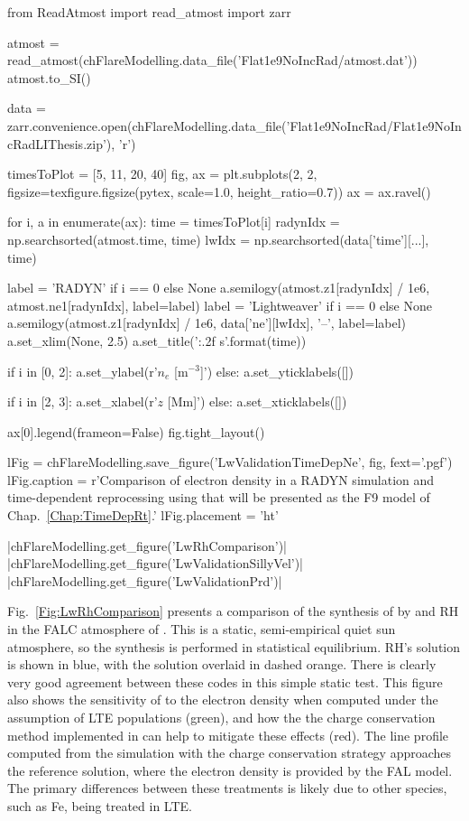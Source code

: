 \begin{pycode}[FlareModelling]
from ReadAtmost import read_atmost
import zarr

atmost = read_atmost(chFlareModelling.data_file('Flat1e9NoIncRad/atmost.dat'))
atmost.to_SI()

data = zarr.convenience.open(chFlareModelling.data_file('Flat1e9NoIncRad/Flat1e9NoIncRadLIThesis.zip'), 'r')

timesToPlot = [5, 11, 20, 40]
fig, ax = plt.subplots(2, 2, figsize=texfigure.figsize(pytex, scale=1.0, height_ratio=0.7))
ax = ax.ravel()

for i, a in enumerate(ax):
    time = timesToPlot[i]
    radynIdx = np.searchsorted(atmost.time, time)
    lwIdx = np.searchsorted(data['time'][...], time)

    label = 'RADYN' if i == 0 else None
    a.semilogy(atmost.z1[radynIdx] / 1e6, atmost.ne1[radynIdx], label=label)
    label = 'Lightweaver' if i == 0 else None
    a.semilogy(atmost.z1[radynIdx] / 1e6, data['ne'][lwIdx], '--', label=label)
    a.set_xlim(None, 2.5)
    a.set_title('{:.2f} s'.format(time))

    if i in [0, 2]:
        a.set_ylabel(r'$n_e$ [m$^{-3}$]')
    else:
        a.set_yticklabels([])

    if i in [2, 3]:
        a.set_xlabel(r'$z$ [Mm]')
    else:
        a.set_xticklabels([])

ax[0].legend(frameon=False)
fig.tight_layout()

lFig = chFlareModelling.save_figure('LwValidationTimeDepNe', fig, fext='.pgf')
lFig.caption = r'Comparison of electron density in a RADYN simulation and time-dependent reprocessing using \Lw{} that will be presented as the F9 model of Chap.~\ref{Chap:TimeDepRt}.'
lFig.placement = 'ht'
\end{pycode}

\py[FlareModelling]|chFlareModelling.get_figure('LwRhComparison')|
\py[FlareModelling]|chFlareModelling.get_figure('LwValidationSillyVel')|
\py[FlareModelling]|chFlareModelling.get_figure('LwValidationPrd')|


Fig.~\ref{Fig:LwRhComparison} presents a comparison of the synthesis of \CaLine{} by \Lw{} and RH in the FALC atmosphere of \citet{Fontenla1993}.
This is a static, semi-empirical quiet sun atmosphere, so the synthesis is performed in statistical equilibrium.
RH's solution is shown in blue, with the \Lw{} solution overlaid in dashed orange.
There is clearly very good agreement between these codes in this simple static test.
This figure also shows the sensitivity of \CaLine to the electron density when computed under the assumption of LTE populations (green), and how the the charge conservation method implemented in \Lw{} can help to mitigate these effects (red).
The line profile computed from the simulation with the charge conservation strategy approaches the reference solution, where the electron density is provided by the FAL model.
The primary differences between these treatments is likely due to other species, such as Fe, being treated in LTE.

